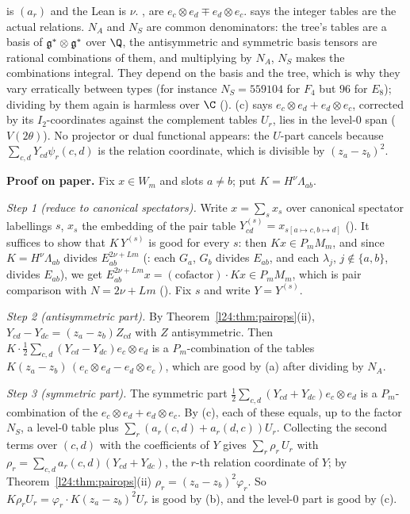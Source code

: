 \begin{dictionary}
 is $(a_r)$ and the Lean  is $\nu$. ,  are $e_c\otimes e_d\mp e_d\otimes e_c$.
 says the integer tables are the actual relations. $N_A$ and $N_S$ are common denominators: the tree's tables are a
basis of $\mathfrak g^*\otimes\mathfrak g^*$ over $\Q$, the antisymmetric and symmetric basis tensors are rational combinations of
them, and multiplying by $N_A$, $N_S$ makes the combinations integral. They depend on the basis and the tree, which is why
they vary erratically between types (for instance $N_S=559104$ for $F_4$ but $96$ for $E_8$); dividing by them again is
harmless over $\C$ (). (c) says $e_c\otimes e_d+e_d\otimes e_c$, corrected by its $I_2$-coordinates against the complement tables
$U_r$, lies in the level-0 span ($V(2\theta)$). No projector or dual functional appears: the $U$-part cancels because
$\sum_{c,d}Y_{cd}\psi_r(c,d)$ is the relation coordinate, which is divisible by $(z_a-z_b)^2$.
\end{dictionary}

\textbf{Proof on paper.} Fix $x\in W_m$ and slots $a\neq b$; put $K=H^\nu\Lambda_{ab}$.

\emph{Step 1 (reduce to canonical spectators).} Write $x=\sum_sx_s$ over canonical spectator labellings $s$, $x_s$ the
embedding of the pair table $Y^{(s)}_{cd}=x_{s[a\mapsto c,b\mapsto d]}$ (). It suffices to show
that $K\,Y^{(s)}$ is good for every $s$: then $Kx\in P_mM_m$, and since $K=H^\nu\Lambda_{ab}$ divides
$E_{ab}^{2\nu+Lm}$ (: each $G_a$, $G_b$ divides $E_{ab}$, and each $\lambda_j$, $j\notin\{a,b\}$, divides $E_{ab}$), we
get $E_{ab}^{2\nu+Lm}x=(\text{cofactor})\cdot Kx\in P_mM_m$, which is pair comparison with $N=2\nu+Lm$
(). Fix $s$ and write $Y=Y^{(s)}$.

\emph{Step 2 (antisymmetric part).} By Theorem~\ref{l24:thm:pairops}(ii), $Y_{cd}-Y_{dc}=(z_a-z_b)Z_{cd}$ with $Z$
antisymmetric. Then $K\cdot\frac12\sum_{c,d}(Y_{cd}-Y_{dc})e_c\otimes e_d$ is a $P_m$-combination of the tables
$K(z_a-z_b)\,(e_c\otimes e_d-e_d\otimes e_c)$, which are good by (a) after dividing by $N_A$.

\emph{Step 3 (symmetric part).} The symmetric part $\frac12\sum_{c,d}(Y_{cd}+Y_{dc})e_c\otimes e_d$ is a $P_m$-combination of the
$e_c\otimes e_d+e_d\otimes e_c$. By (c), each of these equals, up to the factor $N_S$, a level-0 table plus
$\sum_r(a_r(c,d)+a_r(d,c))U_r$. Collecting the second terms over $(c,d)$ with the coefficients of $Y$ gives
$\sum_r\rho_r\,U_r$ with $\rho_r=\sum_{c,d}a_r(c,d)(Y_{cd}+Y_{dc})$, the $r$-th relation coordinate of $Y$; by
Theorem~\ref{l24:thm:pairops}(ii) $\rho_r=(z_a-z_b)^2\varphi_r$. So $K\rho_rU_r=\varphi_r\cdot K(z_a-z_b)^2U_r$ is good by (b), and
the level-0 part is good by (c).

